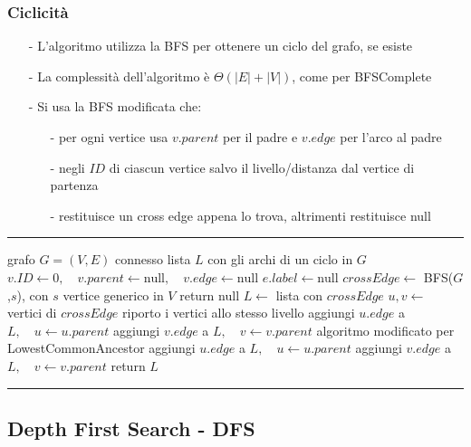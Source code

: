 \documentclass[a4paper]{article}
\makeatletter
\newenvironment{algo}[4]{
	\noindent\rule{\textwidth}{0.4pt}
	\begin{algorithmic}[1]
		\addtocounter{ALG@line}{-1}
		\Procedure{#1}{#2}
		\Require #3
		\Ensure #4
		\Statex }{
		\EndProcedure
	\end{algorithmic}
	\rule{\textwidth}{0.4pt}}
\makeatother
\begin{document}
\subsubsection*{Ciclicità}
\begin{itemize}[topsep=3pt, itemsep=0pt]
	\item[-] L'algoritmo utilizza la BFS per ottenere un ciclo del grafo, se esiste
	\item[-] La complessità dell'algoritmo è \(\Theta(|E| + |V|)\), come per BFSComplete
	\item[-] Si usa la BFS modificata che:
	\begin{itemize}[topsep=0pt, itemsep=0pt]
		\item[-] per ogni vertice usa \(v.parent\) per il padre e \(v.edge\) per l'arco al padre
		\item[-] negli \(I\!D\) di ciascun vertice salvo il livello/distanza dal vertice di partenza
		\item[-] restituisce un cross edge appena lo trova, altrimenti restituisce null
	\end{itemize}
\end{itemize}
\begin{algo}{}{$G$}{grafo $G = (V,E)$ connesso}{lista $L$ con gli archi di un ciclo in \(G\)}
	 \(v.I\!D \gets 0, \quad v.parent \gets \text{null}, \quad v.edge \gets \text{null}\)
	\EndFor
	 \(e.label \gets \text{null}\)
	\EndFor
	\State \(crossEdge \gets\) BFS(\(G\),\(s\)), con \(s\) vertice generico in \(V\)
	 return null
	\Else
		\State \(L \gets\) lista con \(crossEdge\)
		\State \(u,v \gets\) vertici di \(crossEdge\)
		 \Comment riporto i vertici allo stesso livello
			\State aggiungi \(u.edge\) a \(L, \quad u \gets u.parent\)
			\State aggiungi \(v.edge\) a \(L, \quad v \gets v.parent\)
		\EndIf
		 \Comment algoritmo modificato per LowestCommonAncestor
			\State aggiungi \(u.edge\) a \(L, \quad u \gets u.parent\)
			\State aggiungi \(v.edge\) a \(L, \quad v \gets v.parent\)
		\EndWhile
		\State return \(L\)
	\EndIf
\end{algo}

\newpage

\subsection{Depth First Search - DFS}
\end{document}

